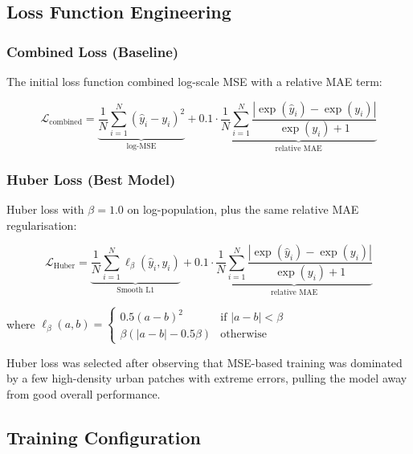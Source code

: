 \documentclass[12pt,a4paper]{article}
\begin{document}
\subsection{Loss Function Engineering}
\label{subsec:loss}

\subsubsection{Combined Loss (Baseline)}

The initial loss function combined log-scale MSE with a relative MAE term:

\begin{equation}
\mathcal{L}_{\text{combined}} = \underbrace{\frac{1}{N} \sum_{i=1}^{N} (\hat{y}_i - y_i)^2}_{\text{log-MSE}} + 0.1 \cdot \underbrace{\frac{1}{N} \sum_{i=1}^{N} \frac{|\exp(\hat{y}_i) - \exp(y_i)|}{\exp(y_i) + 1}}_{\text{relative MAE}}
\label{eq:combined}
\end{equation}

\subsubsection{Huber Loss (Best Model)}

Huber loss with $\beta = 1.0$ on log-population, plus the same relative MAE regularisation:

\begin{equation}
\mathcal{L}_{\text{Huber}} = \underbrace{\frac{1}{N} \sum_{i=1}^{N} \ell_{\beta}(\hat{y}_i, y_i)}_{\text{Smooth L1}} + 0.1 \cdot \underbrace{\frac{1}{N} \sum_{i=1}^{N} \frac{|\exp(\hat{y}_i) - \exp(y_i)|}{\exp(y_i) + 1}}_{\text{relative MAE}}
\label{eq:huber}
\end{equation}

where $\ell_{\beta}(a, b) = \begin{cases} 0.5(a-b)^2 & \text{if } |a-b| < \beta \\ \beta(|a-b| - 0.5\beta) & \text{otherwise} \end{cases}$

Huber loss was selected after observing that MSE-based training was dominated by a few high-density urban patches with extreme errors, pulling the model away from good overall performance.

\subsection{Training Configuration}
\label{subsec:training}
\end{document}
